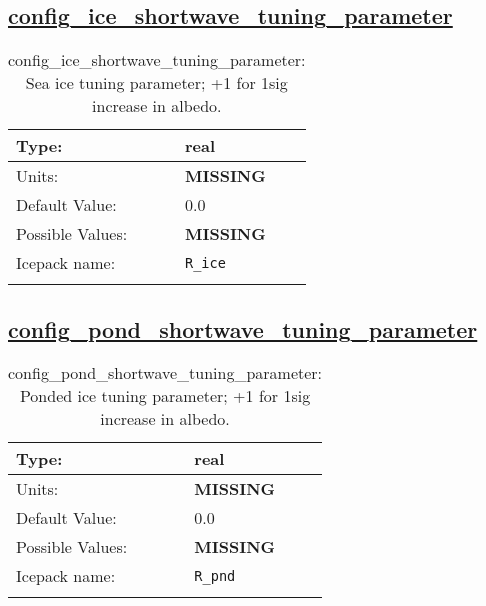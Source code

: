 \subsection[config\_ice\_shortwave\_tuning\_parameter]{\hyperref[sec:nm_tab_shortwave]{config\_ice\_shortwave\_tuning\_parameter}}
\label{subsec:nm_sec_config_ice_shortwave_tuning_parameter}
\begin{center}
\begin{longtable}{| p{2.0in} || p{4.0in} |}
    \hline
    Type: & real \\
    \hline
    Units: & {\bf \color{red} MISSING} \\
    \hline
    Default Value: & 0.0 \\
    \hline
    Possible Values: & {\bf \color{red} MISSING} \\
    \hline
    \hline
    Icepack name: & \verb+R_ice+ \\
    \caption{config\_ice\_shortwave\_tuning\_parameter: Sea ice tuning parameter; +1 for 1sig increase in albedo.}
\end{longtable}
\end{center}
\subsection[config\_pond\_shortwave\_tuning\_parameter]{\hyperref[sec:nm_tab_shortwave]{config\_pond\_shortwave\_tuning\_parameter}}
\label{subsec:nm_sec_config_pond_shortwave_tuning_parameter}
\begin{center}
\begin{longtable}{| p{2.0in} || p{4.0in} |}
    \hline
    Type: & real \\
    \hline
    Units: & {\bf \color{red} MISSING} \\
    \hline
    Default Value: & 0.0 \\
    \hline
    Possible Values: & {\bf \color{red} MISSING} \\
    \hline
    \hline
    Icepack name: & \verb+R_pnd+ \\
    \caption{config\_pond\_shortwave\_tuning\_parameter: Ponded ice tuning parameter; +1 for 1sig increase in albedo.}
\end{longtable}
\end{center}
